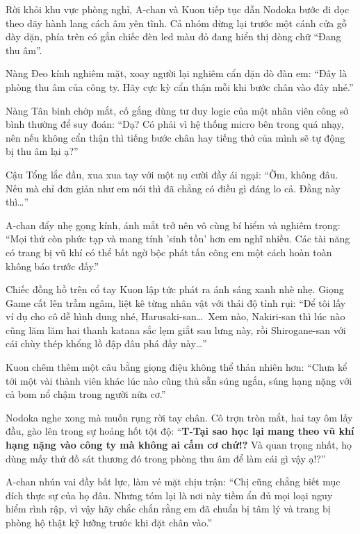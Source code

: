 \documentclass[../main.tex]{subfiles}
\begin{document}
\ct

Rời khỏi khu vực phòng nghỉ, A-chan và Kuon tiếp tục dẫn Nodoka bước đi dọc theo dãy hành lang cách âm yên tĩnh. Cả nhóm dừng lại trước một cánh cửa gỗ dày dặn, phía trên có gắn chiếc đèn led màu đỏ đang hiển thị dòng chữ ``Đang thu âm''.

Nàng Đeo kính nghiêm mặt, xoay người lại nghiêm cẩn dặn dò đàn em: ``Đây là phòng thu âm của công ty. Hãy cực kỳ cẩn thận mỗi khi bước chân vào đây nhé.''

Nàng Tân binh chớp mắt, cố gắng dùng tư duy logic của một nhân viên công sở bình thường để suy đoán: ``Dạ? Có phải vì hệ thống micro bên trong quá nhạy, nên nếu không cẩn thận thì tiếng bước chân hay tiếng thở của mình sẽ tự động bị thu âm lại ạ?''

Cậu Tổng lắc đầu, xua xua tay với một nụ cười đầy ái ngại: ``Ờm, không đâu. Nếu mà chỉ đơn giản như em nói thì đã chẳng có điều gì đáng lo cả. Đằng này thì\dots''

A-chan đẩy nhẹ gọng kính, ánh mắt trở nên vô cùng bí hiểm và nghiêm trọng: ``Mọi thứ còn phức tạp và mang tính 'sinh tồn' hơn em nghĩ nhiều. Các tài năng có trang bị vũ khí có thể bất ngờ bộc phát tấn công em một cách hoàn toàn không báo trước đấy.''

Chiếc đồng hồ trên cổ tay Kuon lập tức phát ra ánh sáng xanh nhè nhẹ. Giọng Game cất lên trầm ngâm, liệt kê từng nhân vật với thái độ tỉnh rụi: ``Để tôi lấy ví dụ cho cô dễ hình dung nhé, Harusaki-san\dots\ Xem nào, Nakiri-san thì lúc nào cũng lăm lăm hai thanh katana sắc lẹm giắt sau lưng này, rồi Shirogane-san với cái chùy thép khổng lồ đập đâu phá đấy này\dots''

Kuon chêm thêm một câu bằng giọng điệu không thể thản nhiên hơn: ``Chưa kể tới một vài thành viên khác lúc nào cũng thủ sẵn súng ngắn, súng hạng nặng với cả bom nổ chậm trong người nữa cơ.''

Nodoka nghe xong mà muốn rụng rời tay chân. Cô trợn tròn mắt, hai tay ôm lấy đầu, gào lên trong sự hoảng hốt tột độ: ``\textbf{T-Tại sao học lại mang theo vũ khí hạng nặng vào công ty mà không ai cấm cơ chứ!?} Và quan trọng nhất, họ dùng mấy thứ đồ sát thương đó trong phòng thu âm để làm cái gì vậy ạ!?''

A-chan nhún vai đầy bất lực, làm vẻ mặt chịu trận: ``Chị cũng chẳng biết mục đích thực sự của họ đâu. Nhưng tóm lại là nơi này tiềm ẩn đủ mọi loại nguy hiểm rình rập, vì vậy hãy chắc chắn rằng em đã chuẩn bị tâm lý và trang bị phòng hộ thật kỹ lưỡng trước khi đặt chân vào.''
\end{document}
